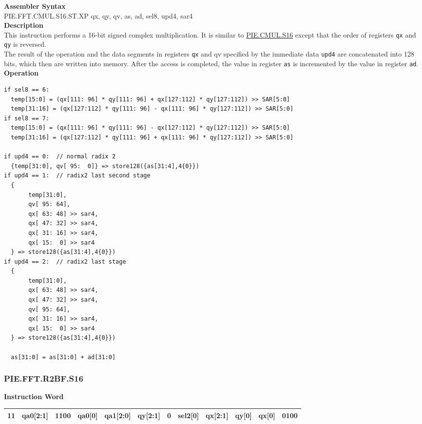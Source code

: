 \textbf{Assembler Syntax} \\
PIE.FFT.CMUL.S16.ST.XP qx, qy, qv, as, ad, sel8, upd4, sar4 \\
\textbf{Description} \\
This instruction performs a 16-bit signed complex multiplication. It is similar to \hyperref[instruction:PIECMULS16]{PIE.CMUL.S16} except that the order of registers \lstinline{qx} and \lstinline{qy} is reversed.\\
The result of the operation and the data segments in registers \lstinline{qx} and qv specified by the immediate data \lstinline{upd4} are concatenated into 128 bits, which then are written into memory. After the access is completed, the value in register \lstinline{as} is incremented by the value in register \lstinline{ad}.
\textbf{Operation}
\begin{lstlisting}
if sel8 == 6:
  temp[15:0] = (qx[111: 96] * qy[111: 96] + qx[127:112] * qy[127:112]) >> SAR[5:0]
  temp[31:16] = (qx[127:112] * qy[111: 96] - qx[111: 96] * qy[127:112]) >> SAR[5:0]
if sel8 == 7:
  temp[15:0] = (qx[111: 96] * qy[111: 96] - qx[127:112] * qy[127:112]) >> SAR[5:0]
  temp[31:16] = (qx[127:112] * qy[111: 96] + qx[111: 96] * qy[127:112]) >> SAR[5:0]

if upd4 == 0:  // normal radix 2
  {temp[31:0], qv[ 95:  0]} => store128({as[31:4],4{0}})
if upd4 == 1:  // radix2 last second stage
  {
       temp[31:0],
       qv[ 95: 64],
       qx[ 63: 48] >> sar4,
       qx[ 47: 32] >> sar4,
       qx[ 31: 16] >> sar4,
       qx[ 15:  0] >> sar4
  } => store128({as[31:4],4{0}})
if upd4 == 2:  // radix2 last stage
  {
       temp[31:0],
       qx[ 63: 48] >> sar4,
       qx[ 47: 32] >> sar4,
       qv[ 95: 64],
       qx[ 31: 16] >> sar4,
       qx[ 15:  0] >> sar4
  } => store128({as[31:4],4{0}})

  as[31:0] = as[31:0] + ad[31:0]
\end{lstlisting}



\newpage
\subsubsection{PIE.FFT.R2BF.S16}\label{instruction:PIEFFTR2BFS16}
\setlength\tabcolsep{6pt}
\textbf{Instruction Word} \\
\begin{tabular}{|c|c|c|c|c|c|c|c|c|c|c|c|}
	\hline
	11 & qa0[2:1] & 1100 & qa0[0] & qa1[2:0] & qy[2:1] & 0 & sel2[0] & qx[2:1] & qy[0] & qx[0] & 0100 \\
	\hline
\end{tabular}


